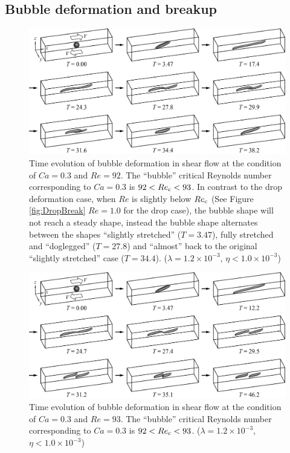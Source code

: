 \documentclass[%
 reprint,
 showkeys,
 amsmath,amssymb,
 aps,
 prfluids,
 onecolumn
]{revtex4-2}
\begin{document}
\subsection{Bubble deformation and breakup}
% 
\begin{figure}%
  \centering
  \includegraphics[width=\textwidth]{BubbleBreakCa0p3Re92}
  \caption{Time evolution of bubble deformation in shear flow at the
           condition of $Ca=0.3$ and $Re=92$.  
	   The ``bubble'' 
	   critical Reynolds number corresponding to $Ca=0.3$ is
	   $92<Re_{\rm c}<93$.  In contrast to the drop deformation case,
           when $Re$ is slightly below $Re_{\rm c}$
           (See Figure \ref{fig:DropBreak} $Re=1.0$ for the drop case), 
           the bubble shape will
           not reach a steady shape, instead the bubble shape alternates
           between the shapes ``slightly stretched'' ($T=3.47$),
           fully stretched and ``doglegged'' ($T=27.8$) and ``almost''
           back to the original ``slightly stretched'' case 
           ($T=34.4$). 
           ($\lambda = 1.2 \times 10^{-3}$, $\eta < 1.0 \times 10^{-3}$) 
	   }
  \label{fig:BubbleBreakCa0p3Re92}
\end{figure}
%
\begin{figure}%
  \centering
  \includegraphics[width=\textwidth]{BubbleBreakCa0p3Re93}
  \caption{Time evolution of bubble deformation in shear flow at the
           condition of $Ca=0.3$ and $Re=93$.
	   The ``bubble'' 
	   critical Reynolds number corresponding to $Ca=0.3$ is
	   $92<Re_{\rm c}<93$.
           ($\lambda = 1.2 \times 10^{-3}$, $\eta < 1.0 \times 10^{-3}$) 
	   }
  \label{fig:BubbleBreakCa0p3Re93}
\end{figure}
\end{document}
